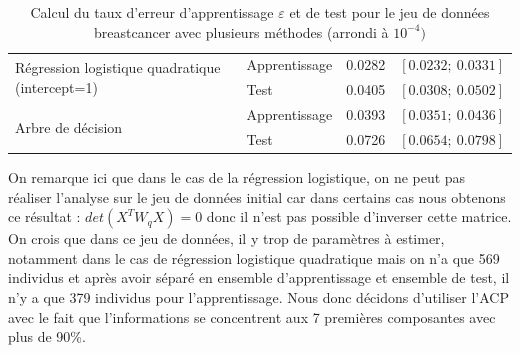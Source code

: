 \documentclass[a4paper,11pt,oneside,roman]{article}
\begin{document}
\begin{table}[H]
\begin{tabular}{l|l|cc}
\multirow{2}{*}{Régression logistique quadratique (intercept=1)}                  & Apprentissage    & 0.0282                            & $\left[0.0232 ;~ 0.0331\right]$  \\
                                       & Test             & 0.0405                                 & $\left[0.0308 ;~ 0.0502 \right]$ \\ \hline      
\multirow{2}{*}{Arbre de décision}                  & Apprentissage    & 0.0393                             & $\left[0.0351 ;~  0.0436 \right]$  \\
                                       & Test             & 0.0726                                 & $\left[0.0654 ;~ 0.0798 \right]$ 
\end{tabular}

\caption{Calcul du taux d'erreur d'apprentissage $\varepsilon$ et de test pour le jeu de données breastcancer avec plusieurs méthodes (arrondi à $10^{-4})$}
\label{breastcancer}
\end{table}
On remarque ici que dans le cas de la régression logistique, on ne peut pas réaliser l'analyse sur le jeu de données initial car dans certains cas nous obtenons ce résultat : $det(X^{T}W_{q}X) =  0$ donc il n'est pas possible d'inverser cette matrice. On crois que dans ce jeu de données, il y trop de paramètres à estimer, notamment dans le cas de régression logistique quadratique mais on n'a que 569 individus et après avoir séparé en ensemble d'apprentissage et ensemble de test, il n'y a que 379 individus pour l'apprentissage. Nous donc décidons d'utiliser l'ACP avec le fait que l'informations se concentrent aux 7 premières composantes avec plus de 90\%. \newline
\end{document}
